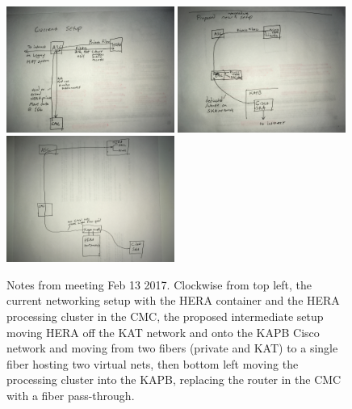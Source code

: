 \documentclass{article}
\begin{document}
\begin{figure}[H]
\includegraphics[width=0.49\textwidth]{HERA_network_Jan2017.jpg}
\includegraphics[width=0.49\textwidth]{HERA_network_2017_CMC.jpg}
\includegraphics[width=0.49\textwidth]{HERA_network_2017_KAPB.jpg}
\caption{Notes from meeting Feb 13 2017. Clockwise from top left, the current networking setup with the HERA container and the HERA processing cluster in the CMC, the proposed intermediate setup moving HERA off the KAT network and onto the KAPB Cisco network and moving from two fibers (private and KAT) to a single fiber hosting two virtual nets, then bottom left moving the processing cluster into the KAPB, replacing the router in the CMC with a fiber pass-through. \label{fig:network_drawings}}
\end{figure}
\end{document}
